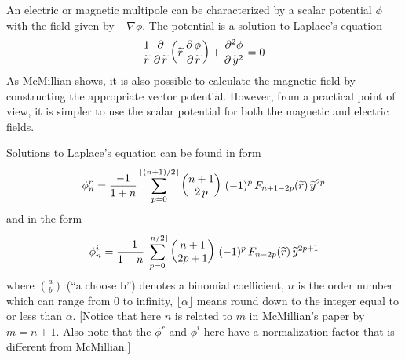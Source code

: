 An electric or magnetic multipole can be characterized by a scalar potential $\phi$ with
the field given by $-\nabla \phi$.  The potential is a solution to Laplace's equation
\begin{equation}
  \frac{1}{{\widetilde r}} \, \frac{\partial}{\partial \, {\widetilde r}} 
  \left( {\widetilde r} \, \frac{\partial \, \phi}{\partial \, {\widetilde r}} \right) +
  \frac{\partial^2 \phi}{\partial \, {\widetilde y}^2} = 0
\end{equation}
As McMillian shows, it is also possible to calculate the magnetic field by constructing the
appropriate vector potential. However, from a practical point of view, it is simpler to use the
scalar potential for both the magnetic and electric fields.

Solutions to Laplace's equation can be found in form
\begin{equation}
  \phi_{n}^r = \frac{-1}{1+n} \sum_{p = 0}^{\lfloor (n+1)/2 \rfloor} 
             \begin{pmatrix} n + 1 \cr 2 \, p \end{pmatrix} \,
             (-1)^{p} \, F_{n+1-2p}({\widetilde r}) \, {\widetilde y}^{2p}
  \label{pspn1}
\end{equation}
and in the form
\begin{equation}
  \phi_{n}^i = \frac{-1}{1+n} \sum_{p = 0}^{\lfloor n/2 \rfloor} 
             \begin{pmatrix} n + 1 \cr 2p +1 \end{pmatrix} \,
             (-1)^{p} \, F_{n-2p}({\widetilde r}) \, {\widetilde y}^{2p+1}
  \label{pspn2}
\end{equation}
where $\binom{a}{b}$ (``a choose b'') denotes a binomial coefficient, $n$ is the order
number which can range from 0 to infinity, $\lfloor\alpha\rfloor$ means round down to the
integer equal to or less than $\alpha$. [Notice that here $n$ is related to $m$ in
McMillian's paper by $m = n + 1$. Also note that the $\phi^r$ and $\phi^i$ here have a
normalization factor that is different from McMillian.]

